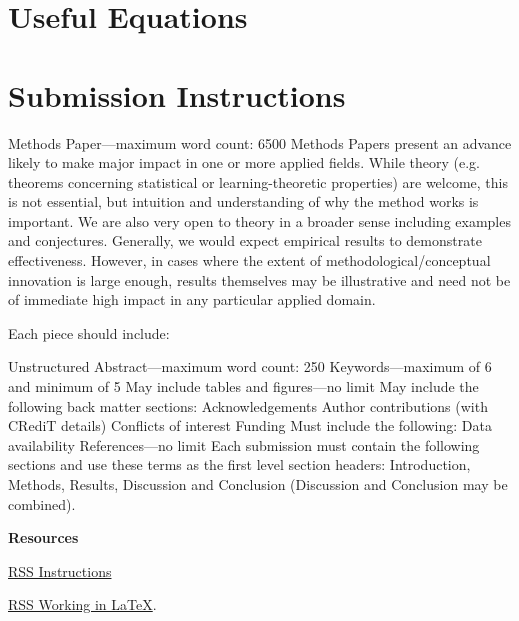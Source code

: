 \documentclass{article}
\begin{document}
\section{Useful Equations}


\section{Submission Instructions}

Methods Paper—maximum word count: 6500
Methods Papers present an advance likely to make major impact in one or more applied
fields. While theory (e.g. theorems concerning statistical or
learning-theoretic properties) are welcome, this is not essential, but intuition and
understanding of why the method works is important.
We are also very open to theory in a broader sense including examples and conjectures.
Generally, we would expect empirical results to demonstrate effectiveness.
However, in cases where the extent of methodological/conceptual innovation is large
enough, results themselves may be illustrative and need not be of immediate high impact
in any particular applied domain.

Each piece should include:

Unstructured Abstract—maximum word count: 250
Keywords—maximum of 6 and minimum of 5
May include tables and figures—no limit
May include the following back matter sections:
Acknowledgements
Author contributions (with CRediT details)
Conflicts of interest
Funding
Must include the following:
Data availability
References—no limit
Each submission must contain the following sections and use these terms as the first
level section headers: Introduction, Methods, Results, Discussion and Conclusion
(Discussion and Conclusion may be combined).

{\bf Resources}

\href{https://academic.oup.com/rssdat/pages/general-instructions}{RSS Instructions} 

\href{https://academic.oup.com/pages/authoring/books/preparing-your-manuscript/working-in-latex}{RSS Working in \LaTeX}.


\end{document}
